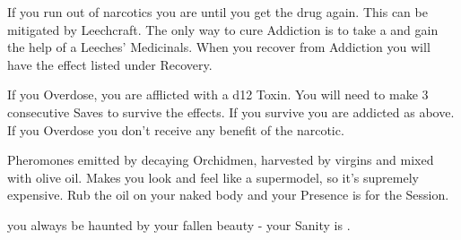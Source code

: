 {\begin{multicols}{2}
  If you run out of narcotics you are  until you get the drug again.  This can be mitigated by Leechcraft. The only way to cure Addiction is to take a  and gain the help of a Leeches' Medicinals\footnotemark.  When you recover from Addiction you will have the effect listed under Recovery.



  If you Overdose, you are afflicted with a d12 Toxin\footnotemark[\value{footnote}].  You will need to make 3 consecutive Saves to survive the effects.  If you survive you are addicted as above. If you Overdose you don't receive any benefit of the narcotic.

  \cbreak






  Pheromones emitted by decaying Orchidmen, harvested by virgins and mixed with olive oil.  Makes you look and feel like a supermodel, so it's supremely expensive.  Rub the oil on your naked body and your \MAX Presence is \DCUP for the Session.

    you always be haunted by your fallen beauty - your \MAX Sanity is \DCDOWN.


\end{multicols}}
